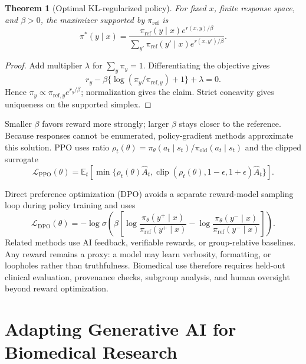 \documentclass[12pt,oneside]{book}
\numberwithin{equation}{section}
\theoremstyle{definition}
\theoremstyle{plain}
\newtheorem{theorem}{Theorem}[section]
\theoremstyle{remark}
\newcommand{\E}{\mathbb{E}}
\begin{document}
\begin{theorem}[Optimal KL-regularized policy]
For fixed $x$, finite response space, and $\beta>0$, the maximizer supported by
$\pi_{\mathrm{ref}}$ is
\[
 \pi^*(y\mid x)=
 \frac{\pi_{\mathrm{ref}}(y\mid x)e^{r(x,y)/\beta}}
 {\sum_{y'}\pi_{\mathrm{ref}}(y'\mid x)e^{r(x,y')/\beta}}.
\]
\end{theorem}
\begin{proof}
Add multiplier $\lambda$ for $\sum_y\pi_y=1$.  Differentiating the objective
gives
\[
 r_y-\beta\{\log(\pi_y/\pi_{\mathrm{ref},y})+1\}+\lambda=0.
\]
Hence $\pi_y\propto\pi_{\mathrm{ref},y}e^{r_y/\beta}$; normalization gives the
claim.  Strict concavity gives uniqueness on the supported simplex.
\end{proof}

Smaller $\beta$ favors reward more strongly; larger $\beta$ stays closer to the
reference.  Because responses cannot be enumerated, policy-gradient methods
approximate this solution.  PPO uses ratio
$\rho_t(\theta)=\pi_\theta(a_t\mid s_t)/\pi_{\mathrm{old}}(a_t\mid s_t)$ and
the clipped surrogate
\[
 \mathcal L_{\mathrm{PPO}}(\theta)=\E_t\left[
 \min\{\rho_t(\theta)\widehat A_t,
 \operatorname{clip}(\rho_t(\theta),1-\epsilon,1+\epsilon)\widehat A_t\}
 \right].
\]

Direct preference optimization (DPO) avoids a separate reward-model sampling
loop during policy training and uses
\[
 \mathcal L_{\mathrm{DPO}}(\theta)=-\log\sigma\!\left(
 \beta\left[
 \log\frac{\pi_\theta(y^+\mid x)}{\pi_{\mathrm{ref}}(y^+\mid x)}
 -\log\frac{\pi_\theta(y^-\mid x)}{\pi_{\mathrm{ref}}(y^-\mid x)}
 \right]\right).
\]
Related methods use AI feedback, verifiable rewards, or group-relative
baselines.  Any reward remains a proxy: a model may learn verbosity, formatting,
or loopholes rather than truthfulness.  Biomedical use therefore requires
held-out clinical evaluation, provenance checks, subgroup analysis, and human
oversight beyond reward optimization.

\section{Adapting Generative AI for Biomedical Research}
\end{document}
